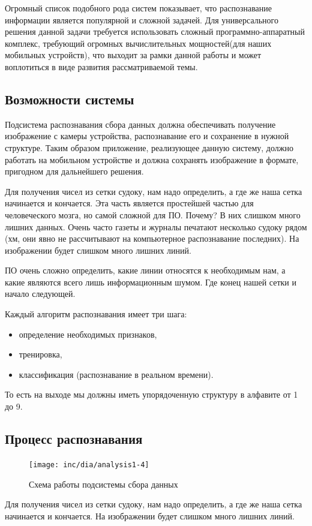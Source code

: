 Огромный список подобного рода систем показывает, что распознавание информации является популярной и сложной задачей. Для универсального решения данной задачи требуется использовать сложный программно-аппаратный комплекс, требующий огромных вычислительных мощностей(для наших мобильных устройств), что выходит за рамки данной работы и может воплотиться в виде развития рассматриваемой темы. 

\subsection{Возможности системы}

Подсистема распознавания сбора данных должна обеспечивать получение изображение с камеры устройства, распознавание его и сохранение в нужной структуре.  Таким образом приложение, реализующее данную систему, должно работать на мобильном устройстве и должна сохранять изображение в формате, пригодном для дальнейшего решения. 

Для получения чисел из сетки судоку, нам надо определить, а где же наша сетка начинается и кончается. Эта часть является простейшей частью для человеческого мозга, но самой сложной для ПО. Почему? В них слишком много лишних данных. Очень часто газеты и журналы печатают несколько судоку рядом (хм, они явно не рассчитывают на компьютерное распознавание последних). На изображении будет слишком много лишних линий. 

ПО очень сложно определить, какие линии относятся к необходимым нам, а какие являются всего лишь информационным шумом. Где конец нашей сетки и начало следующей.

Каждый алгоритм распознавания имеет три шага:
\begin{itemize}
\item определение необходимых признаков,
\item тренировка,
\item классификация (распознавание в реальном времени).
\end{itemize}

То есть на выходе мы должны иметь упорядоченную структуру в алфавите от 1 до 9.

\subsection{Процесс распознавания}
\begin{figure}[ht]
  \centering
  \texttt{[image: inc/dia/analysis1-4]}
  \caption{Схема работы подсистемы сбора данных}
  \label{fig:fig04}
\end{figure}
Для получения чисел из сетки судоку, нам надо определить, а где же наша сетка начинается и кончается.  На изображении будет слишком много лишних линий. 

